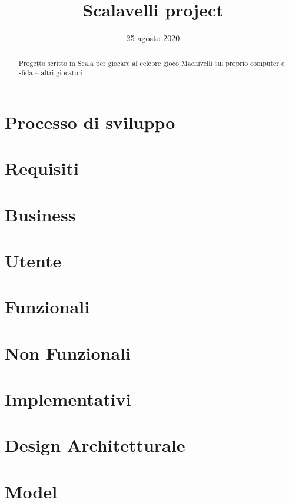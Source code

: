 \documentclass[a4paper,12pt]{article}
\title{Scalavelli project}
\date{25 agosto 2020}
\begin{document}
    \maketitle

    \begin{abstract}
        Progetto scritto in Scala per giocare al celebre gioco Machivelli sul proprio computer e sfidare altri giocatori.
    \end{abstract}

    \tableofcontents
    
    \section{Processo di sviluppo}

    \section{Requisiti}

        \section{Business}

        \section{Utente}

        \section{Funzionali}

        \section{Non Funzionali}

        \section{Implementativi}
    
    \section{Design Architetturale}

        \section{Model}
\end{document}
